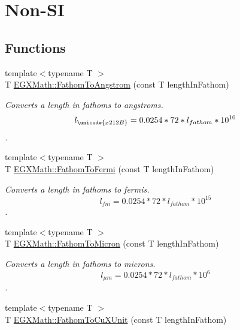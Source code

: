 \hypertarget{group___e_g_x_math-_conversions-_length_conversions-_imperial-_fathom-_non-_s_i}{}\section{Non-\/\+SI}
\label{group___e_g_x_math-_conversions-_length_conversions-_imperial-_fathom-_non-_s_i}
\subsection*{Functions}
\begin{DoxyCompactItemize}
\item 
{\footnotesize template$<$typename T $>$ }\\T \mbox{\hyperlink{group___e_g_x_math-_conversions-_length_conversions-_imperial-_fathom-_non-_s_i_gac03859840078c2a19cbf1f79bcf2b919}{E\+G\+X\+Math\+::\+Fathom\+To\+Angstrom}} (const T length\+In\+Fathom)
\begin{DoxyCompactList}\small\item\em Converts a length in fathoms to angstroms. \[ l_{\unicode{x212B}}=0.0254 * 72 * l_{fathom} * 10^{10} \]. \end{DoxyCompactList}\item 
{\footnotesize template$<$typename T $>$ }\\T \mbox{\hyperlink{group___e_g_x_math-_conversions-_length_conversions-_imperial-_fathom-_non-_s_i_ga4590b655273e874c79a47de291226548}{E\+G\+X\+Math\+::\+Fathom\+To\+Fermi}} (const T length\+In\+Fathom)
\begin{DoxyCompactList}\small\item\em Converts a length in fathoms to fermis. \[ l_{fm}=0.0254 * 72 * l_{fathom} * 10^{15} \]. \end{DoxyCompactList}\item 
{\footnotesize template$<$typename T $>$ }\\T \mbox{\hyperlink{group___e_g_x_math-_conversions-_length_conversions-_imperial-_fathom-_non-_s_i_ga491b6bb1b4db49ba22471e9ca9855198}{E\+G\+X\+Math\+::\+Fathom\+To\+Micron}} (const T length\+In\+Fathom)
\begin{DoxyCompactList}\small\item\em Converts a length in fathoms to microns. \[ l_{\mu m}=0.0254 * 72 * l_{fathom} * 10^{6} \]. \end{DoxyCompactList}\item 
{\footnotesize template$<$typename T $>$ }\\T \mbox{\hyperlink{group___e_g_x_math-_conversions-_length_conversions-_imperial-_fathom-_non-_s_i_ga6692d3fad4af03d78145e34bf0a6c2ac}{E\+G\+X\+Math\+::\+Fathom\+To\+Cu\+X\+Unit}} (const T length\+In\+Fathom)

\end{DoxyCompactItemize}
